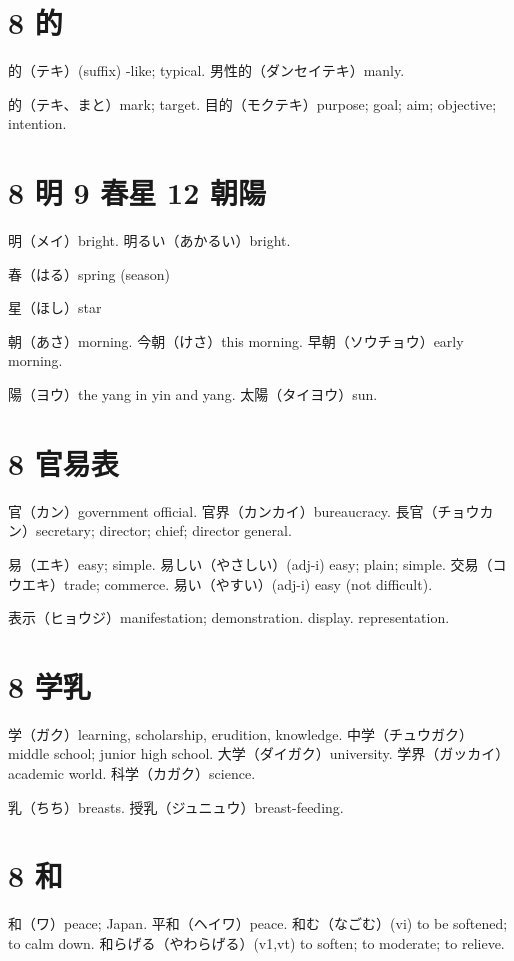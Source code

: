 \section{8 的}

的（テキ）(suffix) -like; typical.
男性的（ダンセイテキ）manly.

的（テキ、まと）mark; target.
目的（モクテキ）purpose; goal; aim; objective; intention.

\section{8 明 9 春星 12 朝陽}

明（メイ）bright.
明るい（あかるい）bright.

春（はる）spring (season)

星（ほし）star

朝（あさ）morning.
今朝（けさ）this morning.
早朝（ソウチョウ）early morning.

陽（ヨウ）the yang in yin and yang.
太陽（タイヨウ）sun.

\section{8 官易表}

官（カン）government official.
官界（カンカイ）bureaucracy.
長官（チョウカン）secretary; director; chief; director general.

易（エキ）easy; simple.
易しい（やさしい）(adj-i) easy; plain; simple.
交易（コウエキ）trade; commerce.
易い（やすい）(adj-i) easy (not difficult).

表示（ヒョウジ）manifestation; demonstration. display. representation.

\section{8 学乳}

学（ガク）learning, scholarship, erudition, knowledge.
中学（チュウガク）middle school; junior high school.
大学（ダイガク）university.
学界（ガッカイ）academic world.
科学（カガク）science.

乳（ちち）breasts.
授乳（ジュニュウ）breast-feeding.

\section{8 和}

和（ワ）peace; Japan.
平和（ヘイワ）peace.
和む（なごむ）(vi) to be softened; to calm down.
和らげる（やわらげる）(v1,vt) to soften; to moderate; to relieve.

